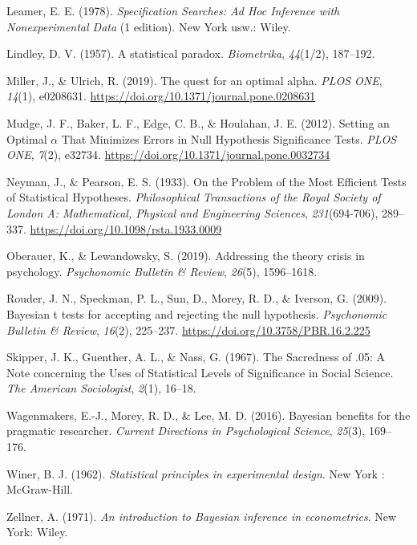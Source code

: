 \documentclass[
  english,
  ,jou,floatsintext]{apa6}
\newlength{\cslhangindent}
\newenvironment{cslreferences}%
  {\setlength{\parindent}{0pt}%
  \everypar{\setlength{\hangindent}{\cslhangindent}}\ignorespaces}%
  {\par}
\begin{document}
\begin{cslreferences}
\leavevmode\hypertarget{ref-leamer_specification_1978}{}%
Leamer, E. E. (1978). \emph{Specification Searches: Ad Hoc Inference with Nonexperimental Data} (1 edition). New York usw.: Wiley.

\leavevmode\hypertarget{ref-lindley_statistical_1957}{}%
Lindley, D. V. (1957). A statistical paradox. \emph{Biometrika}, \emph{44}(1/2), 187--192.

\leavevmode\hypertarget{ref-miller_quest_2019}{}%
Miller, J., \& Ulrich, R. (2019). The quest for an optimal alpha. \emph{PLOS ONE}, \emph{14}(1), e0208631. \url{https://doi.org/10.1371/journal.pone.0208631}

\leavevmode\hypertarget{ref-mudge_setting_2012}{}%
Mudge, J. F., Baker, L. F., Edge, C. B., \& Houlahan, J. E. (2012). Setting an Optimal \(\alpha\) That Minimizes Errors in Null Hypothesis Significance Tests. \emph{PLOS ONE}, \emph{7}(2), e32734. \url{https://doi.org/10.1371/journal.pone.0032734}

\leavevmode\hypertarget{ref-neyman_problem_1933}{}%
Neyman, J., \& Pearson, E. S. (1933). On the Problem of the Most Efficient Tests of Statistical Hypotheses. \emph{Philosophical Transactions of the Royal Society of London A: Mathematical, Physical and Engineering Sciences}, \emph{231}(694-706), 289--337. \url{https://doi.org/10.1098/rsta.1933.0009}

\leavevmode\hypertarget{ref-oberauer2019addressing}{}%
Oberauer, K., \& Lewandowsky, S. (2019). Addressing the theory crisis in psychology. \emph{Psychonomic Bulletin \& Review}, \emph{26}(5), 1596--1618.

\leavevmode\hypertarget{ref-rouder_bayesian_2009}{}%
Rouder, J. N., Speckman, P. L., Sun, D., Morey, R. D., \& Iverson, G. (2009). Bayesian t tests for accepting and rejecting the null hypothesis. \emph{Psychonomic Bulletin \& Review}, \emph{16}(2), 225--237. \url{https://doi.org/10.3758/PBR.16.2.225}

\leavevmode\hypertarget{ref-skipper_sacredness_1967}{}%
Skipper, J. K., Guenther, A. L., \& Nass, G. (1967). The Sacredness of .05: A Note concerning the Uses of Statistical Levels of Significance in Social Science. \emph{The American Sociologist}, \emph{2}(1), 16--18.

\leavevmode\hypertarget{ref-wagenmakers2016bayesian}{}%
Wagenmakers, E.-J., Morey, R. D., \& Lee, M. D. (2016). Bayesian benefits for the pragmatic researcher. \emph{Current Directions in Psychological Science}, \emph{25}(3), 169--176.

\leavevmode\hypertarget{ref-winer_statistical_1962}{}%
Winer, B. J. (1962). \emph{Statistical principles in experimental design}. New York : McGraw-Hill.

\leavevmode\hypertarget{ref-zellner_introduction_1971}{}%
Zellner, A. (1971). \emph{An introduction to Bayesian inference in econometrics}. New York: Wiley.
\end{cslreferences}
\end{document}
